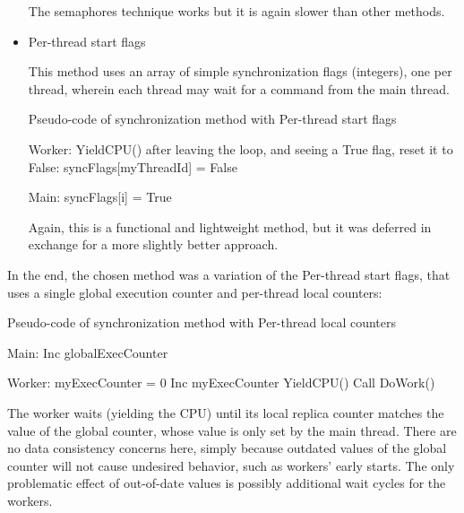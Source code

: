 \begin{itemize}
The semaphores technique works but it is again slower than other methods.



\item Per-thread start flags

This method uses an array of simple synchronization flags (integers), one per thread, wherein each thread may wait for a command from the main thread.

\begin{algorithm}[htb!]
\caption{Pseudo-code of synchronization method with Per-thread start flags}
\label{code-startflags}

\begin{algorithmic}
	\LeftComment Worker:
		\State YieldCPU()
	\EndWhile
	\LeftComment after leaving the loop, and seeing a True flag, reset it to False:
	\State syncFlags[myThreadId] = False

	\LeftComment Main:
		\State syncFlags[i] = True
	\EndFor
\end{algorithmic}
\end{algorithm}

Again, this is a functional and lightweight method, but it was deferred in exchange for a more slightly better approach.

\end{itemize}

In the end, the chosen method was a variation of the Per-thread start flags, that uses a single global execution counter and per-thread local counters:

\begin{algorithm}[htb!]
\caption{Pseudo-code of synchronization method with Per-thread local counters}
\label{code-counters}

\begin{algorithmic}
	\LeftComment Main:
	\State Inc globalExecCounter

	\LeftComment Worker:
	\State myExecCounter = 0
		\State Inc myExecCounter
			\State	YieldCPU()
		\EndWhile
		\State Call DoWork()
	\EndWhile

\end{algorithmic}
\end{algorithm}


The worker waits (yielding the CPU) until its local replica counter matches the value of the global counter, whose value is only set by the main thread.
There are no data consistency concerns here, simply because outdated values of the global counter will not cause undesired behavior, such as workers' early starts. The only problematic effect of out-of-date values is possibly additional wait cycles for the workers.

